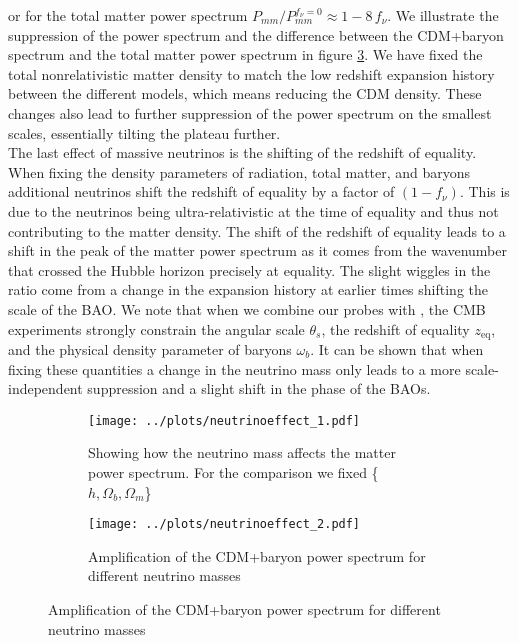 \documentclass[../main.tex]{subfiles}
\begin{document}
or for the total matter power spectrum $P_{mm}/P_{mm}^{f_\nu=0} \approx 1- 8\,f_\nu$. We illustrate the suppression of the power spectrum and the difference between the CDM+baryon spectrum and the total matter power spectrum in figure \ref{fig:Mneutrino_effect}. We have fixed the total nonrelativistic matter density to match the low redshift expansion history between the different models, which means reducing the CDM density. These changes also lead to further suppression of the power spectrum on the smallest scales, essentially tilting the plateau further.\\
The last effect of massive neutrinos is the shifting of the redshift of equality. When fixing the density parameters of radiation, total matter, and baryons additional neutrinos shift the redshift of equality by a factor of $(1-f_\nu)$. This is due to the neutrinos being ultra-relativistic at the time of equality and thus not contributing to the matter density. The shift of the redshift of equality leads to a shift in the peak of the matter power spectrum as it comes from the wavenumber that crossed the Hubble horizon precisely at equality. The slight wiggles in the ratio come from a change in the expansion history at earlier times shifting the scale of the BAO. We note that when we combine our \Euclid probes with \Planck, the CMB experiments strongly constrain the angular scale $\theta_s$, the redshift of equality $z_\mathrm{eq}$, and the physical density parameter of baryons $\omega_b$. It can be shown that when fixing these quantities a change in the neutrino mass only leads to a more scale-independent suppression and a slight shift in the phase of the BAOs.
\begin{figure}
    \centering
    \caption{The effect of changing Neff when fixing different quantities as explained in the Text. The Ratios were multiplied with a factor to better differentiate between them.}
    \begin{subfigure}[b]{0.49\textwidth}
        \centering
        \texttt{[image: ../plots/neutrinoeffect\_1.pdf]}
        \caption{Showing how the neutrino mass affects the matter power spectrum. For the comparison we fixed \{$h,\Omega_b,\Omega_m$\}}
        \label{fig:mnu_suppression}
    \end{subfigure}
    \hfill
    \begin{subfigure}[b]{0.49\textwidth}
        \centering
        \texttt{[image: ../plots/neutrinoeffect\_2.pdf]}
        \caption{Amplification of the CDM+baryon power spectrum for different neutrino masses}
        \label{fig:PcbvPmm}  
    \end{subfigure}
       \label{fig:Mneutrino_effect} 
\end{figure}
\end{document}
